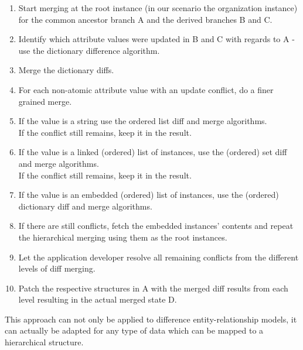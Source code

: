\begin{enumerate}
\item Start merging at the root instance (in our scenario the organization instance) for the common ancestor branch A and the derived branches B and C.
\item Identify which attribute values were updated in B and C with regards to A - use the dictionary difference algorithm.
\item Merge the dictionary diffs.
\item For each non-atomic attribute value with an update conflict, do a finer grained merge.
\item If the value is a string use the ordered list diff and merge algorithms.\\
If the conflict still remains, keep it in the result.
\item If the value is a linked (ordered) list of instances, use the (ordered) set diff and merge algorithms.\\
If the conflict still remains, keep it in the result.
\item If the value is an embedded (ordered) list of instances, use the (ordered) dictionary diff and merge algorithms.
\item If there are still conflicts, fetch the embedded instances' contents and repeat the hierarchical merging using them as the root instances.
\item Let the application developer resolve all remaining conflicts from the different levels of diff merging.
\item Patch the respective structures in A with the merged diff results from each level resulting in the actual merged state D.
\end{enumerate}

This approach can not only be applied to difference entity-relationship models, it can actually be adapted for any type of data which can be mapped to a hierarchical structure.
